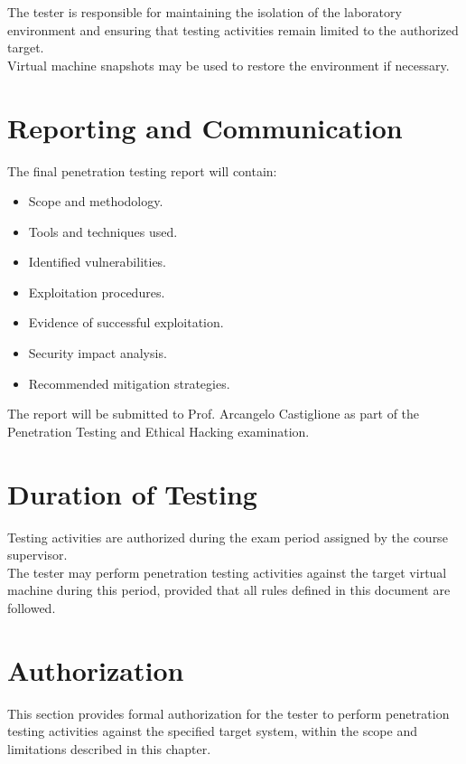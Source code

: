 The tester is responsible for maintaining the isolation of the laboratory
environment and ensuring that testing activities remain limited to the
authorized target.
\\

Virtual machine snapshots may be used to restore the environment if necessary.

\section{Reporting and Communication}
The final penetration testing report will contain:

\begin{itemize}
    \item Scope and methodology.
    \item Tools and techniques used.
    \item Identified vulnerabilities.
    \item Exploitation procedures.
    \item Evidence of successful exploitation.
    \item Security impact analysis.
    \item Recommended mitigation strategies.
\end{itemize}

The report will be submitted to Prof. Arcangelo Castiglione as part of the
Penetration Testing and Ethical Hacking examination.

\section{Duration of Testing}

Testing activities are authorized during the exam period assigned by the
course supervisor.
\\

The tester may perform penetration testing activities against the target
virtual machine during this period, provided that all rules defined in this
document are followed.

\section{Authorization}
This section provides formal authorization for the tester to perform
penetration testing activities against the specified target system, within the scope and limitations described in this chapter.
